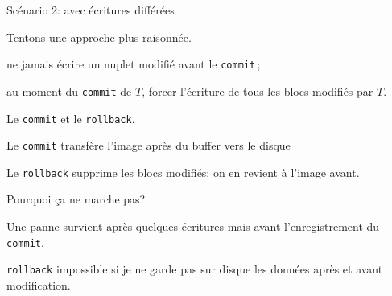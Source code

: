 \documentclass[aspectratio=169, handout]{beamer} %
\begin{document}
\begin{frame}{Scénario 2: avec écritures différées}

Tentons une approche plus raisonnée.

\begin{redbullet}
  \item ne \alert{jamais} écrire un nuplet
modifié \alert{avant} le \texttt{commit}\,; 
  \item au moment
du \texttt{commit} de $T$, forcer l'écriture de \alert{tous} les blocs modifiés
par $T$.
\end{redbullet}

\vfill
Le \texttt{commit} et le \texttt{rollback}.

\vfill

\begin{blocgauche}

\begin{redbullet}
\item Le \texttt{commit} transfère l'image après du buffer vers le disque

\item Le \texttt{rollback} supprime les blocs modifiés: on en revient à l'image avant.
\end{redbullet}

\end{blocgauche}

\end{frame}


\begin{frame}{Pourquoi ça ne marche pas?}

Une panne  survient
      \alert{après}
         quelques écritures mais \alert{avant} l'enregistrement 
        du \texttt{commit}.

\vfill
     

\vfill

\begin{blocgauche}
\texttt{rollback} impossible si je ne garde pas
\alert{sur disque} les données \alert{après} et \alert{avant} modification.
\end{blocgauche}
\end{frame}
\end{document}
